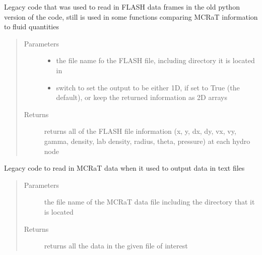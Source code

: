 \documentclass[letterpaper,10pt,english]{sphinxmanual}
\begin{document}

\begin{fulllineitems}
\label{\detokenize{read_process_files:read_process_files.read_flash}}
Legacy code that was used to read in FLASH data frames in the old python version of the code, still is used in some
functions comparing MCRaT information to fluid quantities
\begin{quote}\begin{description}
\item[{Parameters}] \leavevmode\begin{itemize}
\item {} 
 \textendash{} the file name fo the FLASH file, including directory it is located in

\item {} 
 \textendash{} switch to set the output to be either 1D, if set to True (the default), or keep the returned
information as 2D arrays

\end{itemize}

\item[{Returns}] \leavevmode
returns all of the FLASH file information (x, y, dx, dy, vx, vy, gamma, density, lab density, radius,
theta, pressure) at each hydro node

\end{description}\end{quote}

\end{fulllineitems}


\begin{fulllineitems}
\label{\detokenize{read_process_files:read_process_files.read_mcrat}}
Legacy code to read in MCRaT data when it used to output data in text files
\begin{quote}\begin{description}
\item[{Parameters}] \leavevmode
{} \textendash{} the file name of the MCRaT data file including the directory that it is located

\item[{Returns}] \leavevmode
returns all the data in the given file of interest

\end{description}\end{quote}

\end{fulllineitems}
\end{document}
